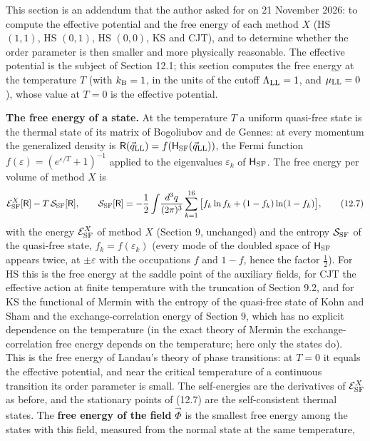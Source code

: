 \documentclass[
  10pt,
]{article}
\begin{document}
This section is an addendum that the author asked for on 21 November
2026: to compute the effective potential and the free energy of each
method \(X\) (HS \((1,1)\), HS \((0,1)\), HS \((0,0)\), KS and CJT), and
to determine whether the order parameter is then smaller and more
physically reasonable. The effective potential is the subject of Section
12.1; this section computes the free energy at the temperature \(T\)
(with \(k_{\rm B}=1\), in the units of the cutoff
\(\Lambda_{\rm LL}=1\), and \(\mu_{\rm LL}=0\)), whose value at \(T=0\)
is the effective potential.

\textbf{The free energy of a state.} At the temperature \(T\) a uniform
quasi-free state is the thermal state of its matrix of Bogoliubov and de
Gennes: at every momentum the generalized density is
\(\mathsf R(\vec q_{\rm LL})=f(\mathsf H_{\rm SF}(\vec q_{\rm LL}))\),
the Fermi function \(f(\varepsilon)=(e^{\varepsilon/T}+1)^{-1}\) applied
to the eigenvalues \(\varepsilon_k\) of \(\mathsf H_{\rm SF}\). The free
energy per volume of method \(X\) is
\[\mathcal E^X_{\rm SF}[\mathsf R]-T\,\mathcal S_{\rm SF}[\mathsf R],\qquad\mathcal S_{\rm SF}[\mathsf R]=-\frac12\int\!\frac{d^3q}{(2\pi)^3}\sum_{k=1}^{16}\big[f_k\ln f_k+(1-f_k)\ln(1-f_k)\big],\tag{12.7}\]
with the energy \(\mathcal E^X_{\rm SF}\) of method \(X\) (Section 9,
unchanged) and the entropy \(\mathcal S_{\rm SF}\) of the quasi-free
state, \(f_k=f(\varepsilon_k)\) (every mode of the doubled space of
\(\mathsf H_{\rm SF}\) appears twice, at \(\pm\varepsilon\) with the
occupations \(f\) and \(1-f\), hence the factor \(\tfrac12\)). For HS
this is the free energy at the saddle point of the auxiliary fields, for
CJT the effective action at finite temperature with the truncation of
Section 9.2, and for KS the functional of Mermin with the entropy of the
quasi-free state of Kohn and Sham and the exchange-correlation energy of
Section 9, which has no explicit dependence on the temperature (in the
exact theory of Mermin the exchange-correlation free energy depends on
the temperature; here only the states do). This is the free energy of
Landau's theory of phase transitions: at \(T=0\) it equals the effective
potential, and near the critical temperature of a continuous transition
its order parameter is small. The self-energies are the derivatives of
\(\mathcal E^X_{\rm SF}\) as before, and the stationary points of (12.7)
are the self-consistent thermal states. The \textbf{free energy of the
field} \(\vec\Phi\) is the smallest free energy among the states with
this field, measured from the normal state at the same temperature,
\end{document}
